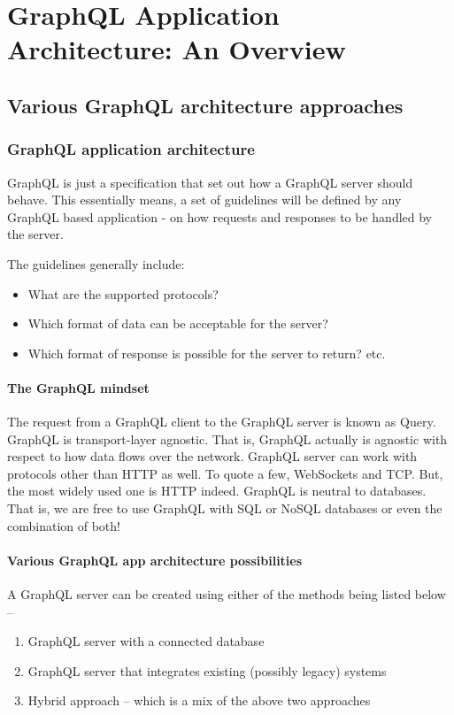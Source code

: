 \documentclass[../main.tex]{subfiles}
\begin{document}
\chapter{GraphQL Application Architecture: An Overview}
\section{Various GraphQL architecture approaches}
\subsection{GraphQL application architecture}
GraphQL is just a specification that set out how a GraphQL server should behave.
This essentially means, a set of guidelines will be defined by any GraphQL based application - on how requests and responses to be handled by the server.


The guidelines generally include:
\begin{itemize}
  \item What are the supported protocols?
  \item Which format of data can be acceptable for the server?
  \item Which format of response is possible for the server to return? etc.
\end{itemize}

\subsubsection{The GraphQL mindset}
The request from a GraphQL client to the GraphQL server is known as Query.
GraphQL is transport-layer agnostic. That is, GraphQL actually is agnostic with respect to how data flows over the network. GraphQL server can work with protocols other than HTTP as well. To quote a few, WebSockets and TCP. But, the most widely used one is HTTP indeed.
GraphQL is neutral to databases. That is, we are free to use GraphQL with SQL or NoSQL databases or even the combination of both!

\subsubsection{Various GraphQL app architecture possibilities}
A GraphQL server can be created using either of the methods being listed below –

\begin{enumerate}
\item GraphQL server with a connected database
\item GraphQL server that integrates existing (possibly legacy) systems
\item Hybrid approach – which is a mix of the above two approaches
\end{enumerate}
\end{document}
